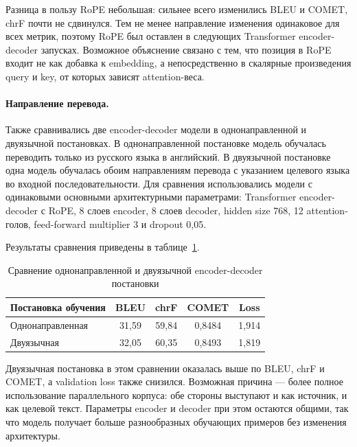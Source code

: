 Разница в пользу RoPE небольшая: сильнее всего изменились BLEU и COMET, chrF почти не сдвинулся. Тем не менее направление изменения одинаковое для всех метрик, поэтому RoPE был оставлен в следующих Transformer encoder-decoder запусках. Возможное объяснение связано с тем, что позиция в RoPE входит не как добавка к embedding, а непосредственно в скалярные произведения query и key, от которых зависят attention-веса.

\paragraph{Направление перевода.}
Также сравнивались две encoder-decoder модели в однонаправленной и двуязычной постановках. В однонаправленной постановке модель обучалась переводить только из русского языка в английский. В двуязычной постановке одна модель обучалась обоим направлениям перевода с указанием целевого языка во входной последовательности. Для сравнения использовались модели с одинаковыми основными архитектурными параметрами: Transformer encoder-decoder с RoPE, 8 слоев encoder, 8 слоев decoder, hidden size 768, 12 attention-голов, feed-forward multiplier 3 и dropout 0{,}05.

Результаты сравнения приведены в таблице~\ref{tab:unidirectional-bilingual-comparison}.

\begin{table}[H]
	\centering
	\caption{Сравнение однонаправленной и двуязычной encoder-decoder постановки}
	\label{tab:unidirectional-bilingual-comparison}
	\begin{tabular}{|p{}|c|c|c|c|}
		\hline
		\textbf{Постановка обучения} & \textbf{BLEU} & \textbf{chrF} & \textbf{COMET} & \textbf{Loss} \\
		\hline
		Однонаправленная             & 31{,}59       & 59{,}84       & 0{,}8484       & 1{,}914       \\
		\hline
		Двуязычная                   & 32{,}05       & 60{,}35       & 0{,}8493       & 1{,}819       \\
		\hline
	\end{tabular}
\end{table}

Двуязычная постановка в этом сравнении оказалась выше по BLEU, chrF и COMET, а validation loss также снизился. Возможная причина --- более полное использование параллельного корпуса: обе стороны выступают и как источник, и как целевой текст. Параметры encoder и decoder при этом остаются общими, так что модель получает больше разнообразных обучающих примеров без изменения архитектуры.

